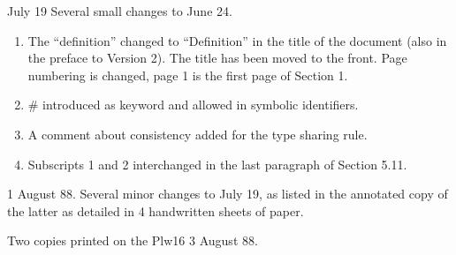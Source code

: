 \begin{description}
\item{July 19} Several small changes to June 24.
\begin{enumerate}
\item The ``definition'' changed to ``Definition'' in the title of the
document (also in the preface to Version 2). The title has been moved
to the front. Page numbering is changed, page 1 is the first page of
Section 1.

\item \# introduced as keyword and allowed in symbolic identifiers.

\item A comment about consistency added for the type sharing rule.

\item Subscripts 1 and 2 interchanged in the last paragraph of Section 
5.11.
\end{enumerate}

\item{1 August 88.} Several minor changes to July 19, as listed in
the annotated copy of the latter as detailed in 4 handwritten sheets
of paper. 

Two copies printed on the Plw16 3 August 88.
\end{description}

